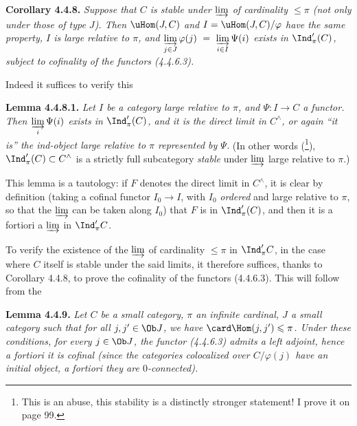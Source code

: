 \textbf{Corollary 4.4.8.} \textit{Suppose that $C$ is stable under $\varinjlim$ of cardinality $\leqslant \pi$ (not only under those of type $J$). Then $\uHom(J,C)$ and $I = \uHom(J,C)/\varphi$ have the same property, $I$ is large relative to $\pi$, and $\varinjlim\limits_{j\in J} \varphi(j) \ =\ \varinjlim\limits_{i\in I} \Psi(i)$ exists in $\Ind'_\pi(C)$, subject to cofinality of the functors (4.4.6.3).}

Indeed it suffices to verify this

\textbf{Lemma 4.4.8.1.} \textit{Let $I$ be a category large relative to $\pi$, and $\Psi : I \longrightarrow C$ a functor. Then $\varinjlim\limits_{i} \Psi(i)$ exists in $\Ind'_\pi(C)$, and it is the direct limit in $C^\wedge$, or again ``it is'' the ind-object large relative to $\pi$ represented by $\Psi$.} (In other words (\footnote[24]{This is an abuse, this stability is a distinctly stronger statement! I prove it on page 99.}), $\Ind'_\pi(C) \subset C^\wedge$ is a strictly full subcategory \textit{stable} under $\varinjlim$ large relative to $\pi$.)

This lemma is a tautology: if $F$ denotes the direct limit in $C^\wedge$, it is clear by definition (taking a cofinal functor $I_0 \longrightarrow I$, with $I_0$ \textit{ordered} and large relative to $\pi$, so that the $\varinjlim$ can be taken along $I_0$) that $F$ is in $\Ind'_\pi(C)$, and then it is a fortiori a $\varinjlim$ in $\Ind'_\pi C$.

To verify the existence of the $\varinjlim$ of cardinality $\leqslant \pi$ in $\Ind'_\pi C$, in the case where $C$ itself is stable under the said limits, it therefore suffices, thanks to Corollary 4.4.8, to prove the cofinality of the functors (4.4.6.3). This will follow from the

\textbf{Lemma 4.4.9.} \textit{Let $C$ be a small category, $\pi$ an infinite cardinal, $J$ a small category such that for all $j, j' \in \Ob J$, we have $\card \Hom(j,j') \leqslant \pi$. Under these conditions, for every $j \in \Ob J$, the functor (4.4.6.3) \textup{admits a left adjoint,} hence a fortiori it is cofinal (since the categories colocalized over $C/\varphi(j)$ have an initial object, a fortiori they are $0$-connected).}

